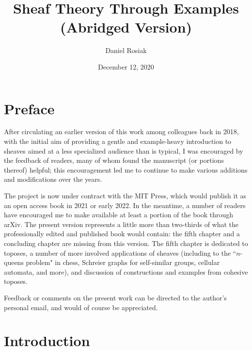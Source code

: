 \documentclass[11pt]{book}
\title{Sheaf Theory Through Examples \\ (\textbf{Abridged Version})}
\author{Daniel Rosiak}
\date{December 12, 2020}
\theoremstyle{definition}
\theoremstyle{definition}
\theoremstyle{definition}
\theoremstyle{theorem}
\theoremstyle{definition}
\begin{document}
	\maketitle 
	\chapter*{Preface} 
	After circulating an earlier version of this work among colleagues back in 2018, with the initial aim of providing a gentle and example-heavy introduction to sheaves aimed at a less specialized audience than is typical, I was encouraged by the feedback of readers, many of whom found the manuscript (or portions thereof) helpful; this encouragement led me to continue to make various additions and modifications over the years. \par 
	The project is now under contract with the MIT Press, which would publish it as an open access book in 2021 or early 2022. In the meantime, a number of readers have encouraged me to make available at least a portion of the book through arXiv. The present version represents a little more than two-thirds of what the professionally edited and published book would contain: the fifth chapter and a concluding chapter are missing from this version. The fifth chapter is dedicated to toposes, a number of more involved applications of sheaves (including to the ``$n$-queens problem" in chess, Schreier graphs for self-similar groups, cellular automata, and more), and discussion of constructions and examples from cohesive toposes.\par 
	
	Feedback or comments on the present work can be directed to the author's personal email, and would of course be appreciated.    
	\tableofcontents
	\newpage
	
	\chapter*{Introduction} 
\end{document}
